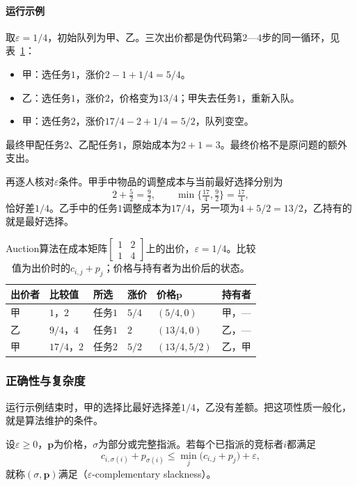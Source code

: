 \paragraph{运行示例}
取$\varepsilon=1/4$，初始队列为甲、乙。三次出价都是伪代码第2—4步的同一循环，见表~\ref{tab:graph-opt-auction-trace}：
\begin{itemize}
  \item 甲：选任务$1$，涨价$2-1+1/4=5/4$。
  \item 乙：选任务$1$，涨价$2$，价格变为$13/4$；甲失去任务$1$，重新入队。
  \item 甲：选任务$2$，涨价$17/4-2+1/4=5/2$，队列变空。
\end{itemize}
最终甲配任务$2$、乙配任务$1$，原始成本为$2+1=3$。最终价格不是原问题的额外支出。

再逐人核对$\varepsilon$条件。甲手中物品的调整成本与当前最好选择分别为
\[
  2+\tfrac52=\tfrac92,\qquad \min\bigl\{\tfrac{17}4,\tfrac92\bigr\}=\tfrac{17}4,
\]
恰好差$1/4$。乙手中的任务$1$调整成本为$17/4$，另一项为$4+5/2=13/2$，乙持有的就是最好选择。

\begin{table}[!htb]
  \centering\small
  \begin{tabular}{@{}llllll@{}}
    \toprule
    出价者 & 比较值 & 所选 & 涨价 & 价格$\bm p$ & 持有者 \\
    \midrule
    甲 & $1$，$2$ & 任务$1$ & $5/4$ & $(5/4,0)$ & 甲，— \\
    乙 & $9/4$，$4$ & 任务$1$ & $2$ & $(13/4,0)$ & 乙，— \\
    甲 & $17/4$，$2$ & 任务$2$ & $5/2$ & $(13/4,5/2)$ & 乙，甲 \\
    \bottomrule
  \end{tabular}
  \caption{Auction算法在成本矩阵$\left[\begin{smallmatrix}1&2\\1&4\end{smallmatrix}\right]$上的出价，$\varepsilon=1/4$。比较值为出价时的$c_{i,j}+p_j$；价格与持有者为出价后的状态。}
  \label{tab:graph-opt-auction-trace}
\end{table}

\subsubsection{正确性与复杂度}

运行示例结束时，甲的选择比最好选择差$1/4$，乙没有差额。把这项性质一般化，就是算法维护的条件。

\begin{definition}
\label{def:graph-opt-eps-cs}
设$\varepsilon\geq0$，$\bm p$为价格，$\sigma$为部分或完整指派。若每个已指派的竞标者$i$都满足
\begin{equation}
  c_{i,\sigma(i)}+p_{\sigma(i)}\leq\min_{j}\bigl(c_{i,j}+p_j\bigr)+\varepsilon,
  \label{eq:graph-opt-eps-cs}
\end{equation}
就称$(\sigma,\bm p)$满足（$\varepsilon$-complementary slackness）。
\end{definition}

